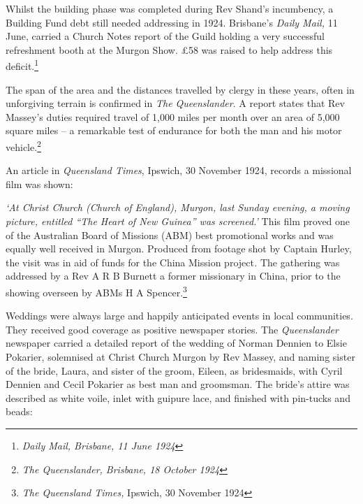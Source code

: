 Whilst the building phase was completed during Rev Shand's incumbency, a Building Fund debt still needed addressing in 1924. Brisbane's \emph{Daily Mail,} 11 June, carried a Church Notes report of the Guild holding a very successful refreshment booth at the Murgon Show. \pounds58 was raised to help address this deficit.\footnote{\emph{Daily Mail, Brisbane, 11 June 1924}}


The span of the area and the distances travelled by clergy in these years, often in unforgiving terrain is confirmed in \emph{The Queenslander}. A report states that Rev Massey's duties required travel of 1,000 miles per month over an area of 5,000 square miles -- a remarkable test of endurance for both the man and his motor vehicle.\footnote{\emph{The Queenslander, Brisbane, 18 October 1924}}


An article in \emph{Queensland Times}, Ipswich, 30 November 1924, records a missional film was shown:



\emph{`At Christ Church (Church of England), Murgon, last Sunday evening, a moving picture, entitled ``The Heart of New Guinea'' was screened.'} This film proved one of the Australian Board of Missions (ABM) best promotional works and was equally well received in Murgon. Produced from footage shot by Captain Hurley, the visit was in aid of funds for the China Mission project\emph{.} The gathering was addressed by a Rev A R B Burnett a former missionary in China, prior to the showing overseen by ABMs H A Spencer.\footnote{\emph{The Queensland Times,} Ipswich, 30 November 1924}


Weddings were always large and happily anticipated events in local communities. They received good coverage as positive newspaper stories. The \emph{Queenslander} newspaper carried a detailed report of the wedding of Norman Dennien to Elsie Pokarier, solemnised at Christ Church Murgon by Rev Massey, and naming sister of the bride, Laura, and sister of the groom, Eileen, as bridesmaids, with Cyril Dennien and Cecil Pokarier as best man and groomsman. The bride's attire was described as white voile, inlet with guipure lace, and finished with pin-tucks and beads:



